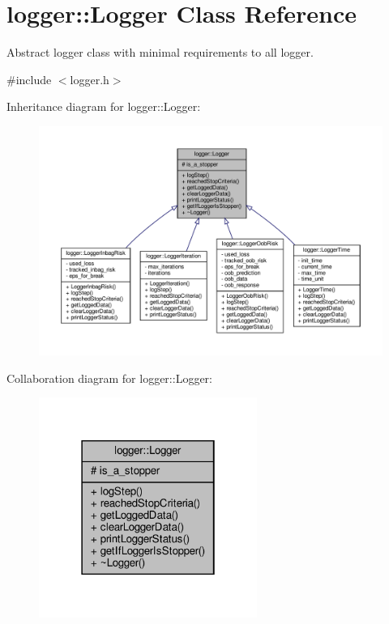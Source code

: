 \hypertarget{classlogger_1_1_logger}{}\section{logger\+:\+:Logger Class Reference}
\label{classlogger_1_1_logger}


Abstract logger class with minimal requirements to all logger.  




{\ttfamily \#include $<$logger.\+h$>$}



Inheritance diagram for logger\+:\+:Logger\+:
\nopagebreak
\begin{figure}[H]
\begin{center}
\leavevmode
\includegraphics[width=350pt]{classlogger_1_1_logger__inherit__graph}
\end{center}
\end{figure}


Collaboration diagram for logger\+:\+:Logger\+:
\nopagebreak
\begin{figure}[H]
\begin{center}
\leavevmode
\includegraphics[width=202pt]{classlogger_1_1_logger__coll__graph}
\end{center}
\end{figure}
